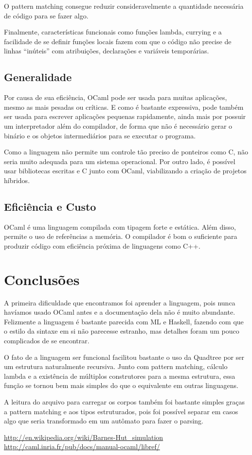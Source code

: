 \documentclass[a4paper,10pt]{article}
\begin{document}
		O pattern matching consegue reduzir consideravelmente a quantidade necessária de código para se fazer algo.
		
		Finalmente, características funcionais como funções lambda, currying e a facilidade de se definir funções locais fazem com que o código não precise de linhas ``inúteis'' com atribuições, declarações e variáveis temporárias.
		
	\subsection{Generalidade}
	
		Por causa de sua eficiência, OCaml pode ser usada para muitas aplicações, mesmo as mais pesadas ou críticas. E como é bastante expressiva, pode também ser usada para escrever aplicações pequenas rapidamente, ainda mais por possuir um interpretador além do compilador, de forma que não é necessário gerar o binário e os objetos intermediários para se executar o programa.
		
		Como a linguagem não permite um controle tão preciso de ponteiros como C, não seria muito adequada para um sistema operacional. Por outro lado, é possível usar bibliotecas escritas e C junto com OCaml, viabilizando a criação de projetos híbridos.
	
	\subsection{Eficiência e Custo}
	
		OCaml é uma linguagem compilada com tipagem forte e estática. Além disso, permite o uso de referências a memória. O compilador é bom o suficiente para produzir código com eficiência próxima de linguagens como C++.
	
\section{Conclusões}

	A primeira dificuldade que encontramos foi aprender a linguagem, pois nunca havíamos usado OCaml antes e a documentação dela não é muito abundante. Felizmente a linguagem é bastante parecida com ML e Haskell, fazendo com que o estilo da sintaxe em si não parecesse estranho, mas detalhes foram um pouco complicados de se encontrar.
	
	O fato de a linguagem ser funcional facilitou bastante o uso da Quadtree por ser um estrutura naturalmente recursiva. Junto com pattern matching, cálculo lambda e a existência de múltiplos construtores para a mesma estrutura, essa função se tornou bem mais simples do que o equivalente em outras linguagens.
	
	A leitura do arquivo para carregar os corpos também foi bastante simples graças a pattern matching e aos tipos estruturados, pois foi possível separar em casos algo que seria transformado em um autômato para fazer o parsing.
	
\begin{thebibliography}{4}
 \url{http://en.wikipedia.org/wiki/Barnes-Hut\_simulation}
 \url{http://caml.inria.fr/pub/docs/manual-ocaml/libref/}
 
\end{thebibliography}
\end{document}
